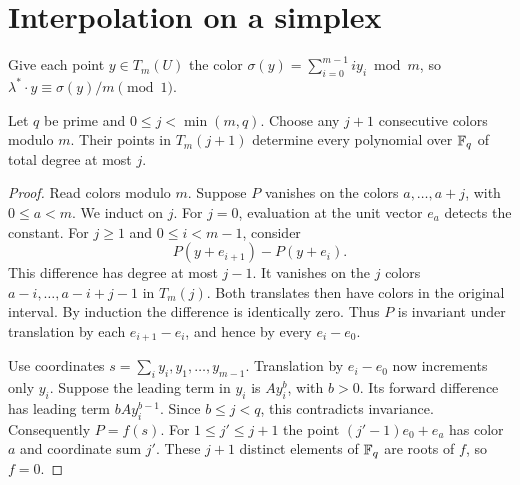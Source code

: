 \section{Interpolation on a simplex}\label{sec:interpolation}

Give each point \(y\in T_m(U)\) the color
\(\sigma(y)=\sum_{i=0}^{m-1}i y_i\bmod m\), so
\(\lambda^*\cdot y\equiv \sigma(y)/m\pmod 1\).

\begin{lemma}\label{lem:color}
Let \(q\) be prime and \(0\le j<\min(m,q)\).
Choose any \(j+1\) consecutive colors modulo \(m\).
Their points in \(T_m(j+1)\) determine every polynomial over \(\mathbb F_q\)
of total degree at most \(j\).
\end{lemma}

\begin{proof}
Read colors modulo \(m\). Suppose \(P\) vanishes on the colors
\(a,\ldots,a+j\), with \(0\le a<m\). We induct on
\(j\). For \(j=0\), evaluation at the unit vector \(e_a\) detects
the constant. For \(j\ge1\) and \(0\le i<m-1\), consider
\[
  P(y+e_{i+1})-P(y+e_i).
\]
This difference has degree at most \(j-1\). It vanishes on the \(j\)
colors \(a-i,\ldots,a-i+j-1\) in \(T_m(j)\). Both translates then have
colors in the original interval. By induction the difference
is identically zero. Thus \(P\) is invariant under translation by each
\(e_{i+1}-e_i\), and hence by every \(e_i-e_0\).

Use coordinates \(s=\sum_i y_i,y_1,\ldots,y_{m-1}\).
Translation by \(e_i-e_0\) now increments only \(y_i\).
Suppose the leading term in \(y_i\) is \(A y_i^b\), with \(b>0\).
Its forward difference has leading term \(bA y_i^{b-1}\).
Since \(b\le j<q\), this contradicts invariance.
Consequently \(P=f(s)\). For \(1\le j'\le j+1\) the point
\((j'-1)e_0+e_a\) has color \(a\) and coordinate sum \(j'\).
These \(j+1\) distinct elements of \(\mathbb F_q\) are roots of \(f\),
so \(f=0\).
\end{proof}
